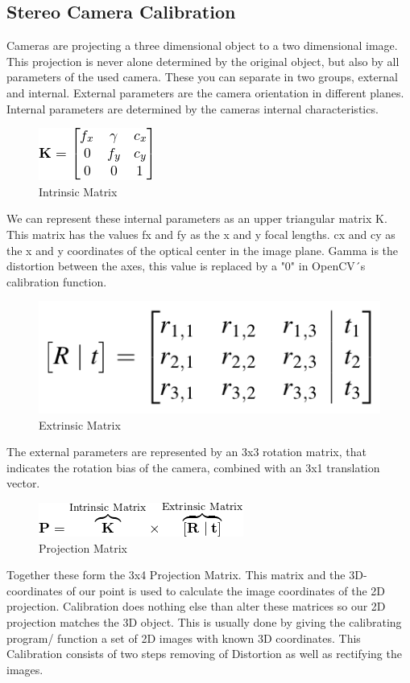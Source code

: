 \documentclass[]{IEEEphot}
\begin{document}
	\subsection{Stereo Camera Calibration}
	Cameras are projecting a three dimensional object to a two dimensional image. This projection is never alone determined by the original object, but also by all parameters of the used camera. These you can separate in two groups, external and internal. External parameters are the camera orientation in different planes. Internal parameters are determined by the cameras internal characteristics.\newline
	\begin{figure}[h!]
	\centering
	\includegraphics[scale=1]{intrinsicMatrix.png}
	\caption{Intrinsic Matrix}
	\end{figure}
	We can represent these internal parameters as an upper triangular matrix K. This matrix has the values fx and fy as the x and y focal lengths. cx and cy as the x and y coordinates of the optical center in the image plane. Gamma is the distortion between the axes, this value is replaced by a "0" in OpenCV´s calibration function.\newline
	\begin{figure}[h!]
		\centering
		\includegraphics[scale=0.7]{extrinsicMatrix.png}
		\caption{Extrinsic Matrix}
	\end{figure}
	The external parameters are represented by an 3x3 rotation matrix, that indicates the rotation bias of the camera, combined with an 3x1 translation vector.\newline
	\begin{figure}[h!]
		\centering
		\includegraphics[scale=0.7]{projectionMatrix.png}
		\caption{Projection Matrix}
	\end{figure}
	Together these form the 3x4 Projection Matrix. This matrix and the 3D-coordinates of our point is used to calculate the image coordinates of the 2D projection. Calibration does nothing else than alter these matrices so our 2D projection matches the 3D object. This is usually done by giving the calibrating program/ function a set of 2D images with known 3D coordinates.\newline
	This Calibration consists of two steps removing of Distortion as well as rectifying the images.
\end{document}
